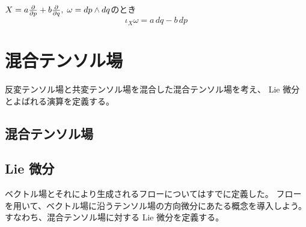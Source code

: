 \documentclass[report]{jlreq}
\begin{document}
\begin{example}
    $X = a \deldel{p} + b \deldel{q}, \; \omega = dp \wedge dq$のとき
    \begin{equation}
        \iota_X \omega = a \, dq - b \, dp
    \end{equation}
    \TODO{}
\end{example}


%
\newpage
\chapter{混合テンソル場}

反変テンソル場と共変テンソル場を混合した混合テンソル場を考え、
Lie 微分とよばれる演算を定義する。

%
\section{混合テンソル場}


\begin{definition}[混合テンソル場]
    \TODO{}
\end{definition}

%
\section{Lie 微分}

ベクトル場とそれにより生成されるフローについてはすでに定義した。
フローを用いて、ベクトル場に沿うテンソル場の方向微分にあたる概念を導入しよう。
すなわち、混合テンソル場に対する Lie 微分を定義する。
\end{document}
